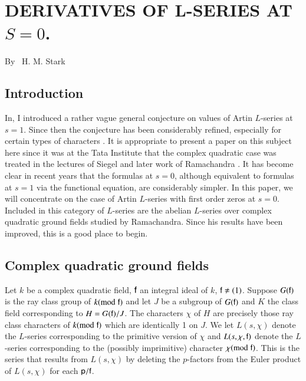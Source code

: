 \chapter{DERIVATIVES OF L-SERIES AT $S=0$.}


\begin{center}
{\large By~ H. M. Stark}
\end{center}

\bigskip

\setcounter{pageoriginal}{260}

\section{Introduction}\label{art9-sec1}
In, I introduced \cite{art9-5} a rather vague general conjecture on values of Artin $L$-series at $s =1$. Since then the conjecture has been considerably refined, especially for certain types of characters \cite[II, III, IV]{art9-6}. It is appropriate to present a paper on this subject here since it was at the Tata Institute that the complex quadratic case was treated in the lectures of Siegel \cite{art9-4} and later work of Ramachandra \cite{art9-3}. It has become clear in recent years that the formulas at $s = 0$, although equivalent to formulas at $s =1$ via the functional equation, are considerably simpler. In this paper, we will concentrate on the case of Artin $L$-series with first order zeros at $s =0$. Included in this category of $L$-series are the abelian $L$-series over complex quadratic ground fields studied by Ramachandra. Since his results have been improved, this is a good place to begin.

\section{Complex quadratic ground fields}\label{art8-sec2} 
Let $k$ be a complex quadratic field, $\mathsf{f}$ an integral ideal of $k$, $\mathsf{f} \neq (1)$. Suppose $G(\mathsf{f})$ is the ray class group of $k({\rm{mod}}\kern.3em \mathsf{f})$ and let $J$ be a subgroup of $G(\mathsf{f})$  and $K$ the class field corresponding to $H = G (\mathsf{f})/J$. The characters $\chi$ of $H$ are precisely those ray class characters of $k ({\rm{mod}}\kern.3em \mathsf{f})$ which are identically 1 on $J$. We let $L (s, \chi)$ denote the $L$-series corresponding to the primitive version of $\chi$ and $L(s,\chi, \mathsf{f})$ denote the $L$-series corresponding to the (possibly imprimitive)  character $\chi ({\rm{mod}}\kern.3em \mathsf{f})$. This is the series that results from $L(s, \chi)$ by deleting the $p$-factors from the Euler product of $L(s, \chi)$ for each $\mathsf{p}/\mathsf{f}$.

